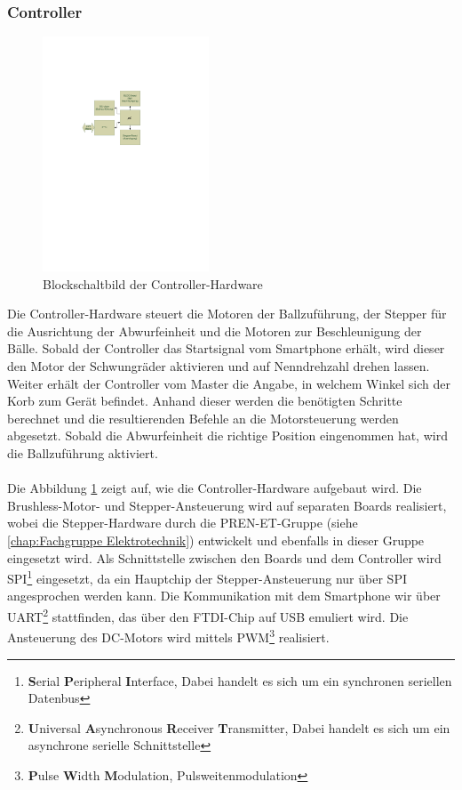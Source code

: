 \subsubsection{Controller}
\label{sec:Controller}
	\begin{figure}
		\centering
		\includegraphics[width=0.44\textwidth,clip,trim= 50mm 16cm 86mm 6.8cm]
			{Enddokumentation/Loesungskonzept/Bilder/Blockschaltbild_Controller.pdf}
		\caption{Blockschaltbild der Controller-Hardware}
		\label{fig:Blockschaltbild_Controller}
	\end{figure}
	Die Controller-Hardware steuert die Motoren der Ballzuführung, der Stepper für die Ausrichtung 
	der Abwurfeinheit und die Motoren zur Beschleunigung der Bälle. Sobald der Controller das Startsignal vom Smartphone erhält, 
	wird dieser den Motor der Schwungräder aktivieren und auf Nenndrehzahl drehen lassen. Weiter erhält der Controller vom Master die Angabe, 
	in welchem Winkel sich der Korb zum Gerät befindet. Anhand dieser werden die benötigten Schritte berechnet und die resultierenden Befehle 
	an die Motorsteuerung werden abgesetzt. Sobald die Abwurfeinheit die richtige Position eingenommen hat, wird die Ballzuführung aktiviert.\\
	\\	
	Die Abbildung \ref{fig:Blockschaltbild_Controller} zeigt auf, wie die Controller-Hardware aufgebaut wird. 
	Die Brushless-Motor- und Stepper-Ansteuerung wird auf separaten Boards realisiert, wobei die Stepper-Hardware durch die PREN-ET-Gruppe (siehe \ref{chap:Fachgruppe Elektrotechnik})
	entwickelt und ebenfalls in dieser Gruppe eingesetzt wird. Als Schnittstelle zwischen den Boards und dem Controller wird SPI\footnote{\textbf{S}erial \textbf{P}eripheral \textbf{I}nterface, Dabei handelt es sich um ein synchronen seriellen Datenbus} eingesetzt, 
	da ein Hauptchip der Stepper-Ansteuerung nur über SPI angesprochen werden kann. Die Kommunikation mit dem Smartphone wir über UART\footnote{\textbf{U}niversal \textbf{A}synchronous \textbf{R}eceiver \textbf{T}ransmitter, Dabei handelt es sich um ein asynchrone serielle Schnittstelle} stattfinden, 
	das über den FTDI-Chip auf USB emuliert wird. Die Ansteuerung des DC-Motors wird mittels PWM\footnote{\textbf{P}ulse \textbf{W}idth \textbf{M}odulation, Pulsweitenmodulation} realisiert.
